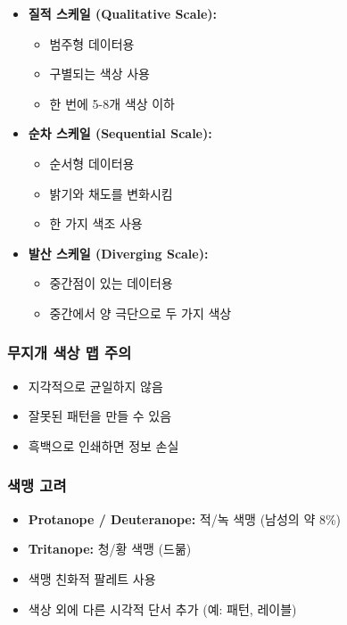 \documentclass[12pt,a4paper]{article}
\begin{document}
\begin{itemize}
    \item \textbf{질적 스케일 (Qualitative Scale):}
    \begin{itemize}
        \item 범주형 데이터용
        \item 구별되는 색상 사용
        \item 한 번에 5-8개 색상 이하
    \end{itemize}

    \item \textbf{순차 스케일 (Sequential Scale):}
    \begin{itemize}
        \item 순서형 데이터용
        \item 밝기와 채도를 변화시킴
        \item 한 가지 색조 사용
    \end{itemize}

    \item \textbf{발산 스케일 (Diverging Scale):}
    \begin{itemize}
        \item 중간점이 있는 데이터용
        \item 중간에서 양 극단으로 두 가지 색상
    \end{itemize}
\end{itemize}

\subsubsection{무지개 색상 맵 주의}

\begin{itemize}
    \item 지각적으로 균일하지 않음
    \item 잘못된 패턴을 만들 수 있음
    \item 흑백으로 인쇄하면 정보 손실
\end{itemize}

\subsubsection{색맹 고려}

\begin{itemize}
    \item \textbf{Protanope / Deuteranope:} 적/녹 색맹 (남성의 약 8\%)
    \item \textbf{Tritanope:} 청/황 색맹 (드묾)
    \item 색맹 친화적 팔레트 사용
    \item 색상 외에 다른 시각적 단서 추가 (예: 패턴, 레이블)
\end{itemize}
\end{document}
